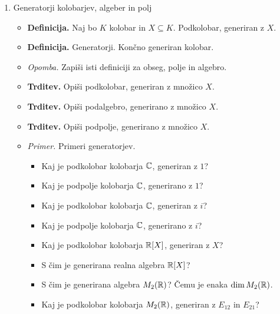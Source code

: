 \begin{enumerate}
    \item Generatorji kolobarjev, algeber in polj
    \begin{itemize}
        \item \colorbox{purple!30}{\textbf{Definicija.}} Naj bo $K$ kolobar in $X \subseteq K$. Podkolobar, generiran z $X$. 
        \item \colorbox{purple!30}{\textbf{Definicija.}} Generatorji. Končno generiran kolobar.
        \item \colorbox{yellow!30}{\emph{Opomba.}} Zapiši isti definiciji za obseg, polje in algebro.
        \item \colorbox{blue!30}{\textbf{Trditev.}} Opiši podkolobar, generiran z množico $X$.
        \item \colorbox{blue!30}{\textbf{Trditev.}} Opiši podalgebro, generirano z množico $X$.
        \item \colorbox{blue!30}{\textbf{Trditev.}} Opiši podpolje, generirano z množico $X$.
        \item \colorbox{yellow!30}{\emph{Primer.}} Primeri generatorjev.
        \begin{itemize}
            \item Kaj je podkolobar kolobarja $\mathbb{C}$, generiran z $1$?
            \item Kaj je podpolje kolobarja $\mathbb{C}$, generirano z $1$?
            \item Kaj je podkolobar kolobarja $\mathbb{C}$, generiran z $i$?
            \item Kaj je podpolje kolobarja $\mathbb{C}$, generirano z $i$?
            \item Kaj je podkolobar kolobarja $\mathbb{R}[X]$, generiran z $X$?
            \item S čim je generirana realna algebra $\mathbb{R}[X]$?
            \item S čim je generirana algebra $M_2(\mathbb{R})$? Čemu je enaka $\dim M_2(\mathbb{R})$.
            \item Kaj je podkolobar kolobarja $M_2(\mathbb{R})$, generiran z $E_{12}$ in $E_{21}$?
        \end{itemize}
    \end{itemize}
\end{enumerate}

\newpage
